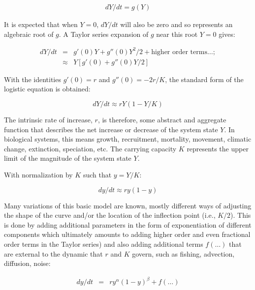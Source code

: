 \documentclass[letterpaper,portrait,11pt]{scrartcl}
\numberwithin{equation}{section}		%
\numberwithin{figure}{section}		%
\numberwithin{table}{section}				%
\begin{document}
\begin{eqnarray} 
\label{eqLogisticContinuous}
dY / dt = g(Y)
\end{eqnarray}

It is expected that when $Y = 0$, $dY/dt$ will also be zero and so represents an algebraic root of $g$. A Taylor series expansion of $g$ near this root $Y=0$ gives:

\begin{eqnarray*} 
  \label{eqLogisticTaylorSeries}
  dY / dt &=&  g'(0) Y + g''(0) Y^{2}/2  + \text{higher order terms} \dots; \\
  &\approx& Y [g'(0) + g''(0) Y/2  ]
\end{eqnarray*}


With the identities $g'(0) = r$  and $g''(0) = - 2r/K$, the standard form of the logistic equation is obtained:

\begin{equation} 
\label{eqLogistic}
dY/dt \approx r Y (1 - Y/K)
\end{equation}

The intrinsic rate of increase, $r$, is therefore, some abstract and aggregate function that describes the net increase or decrease of the system state $Y$. In biological systems, this means growth, recruitment, mortality, movement, climatic change, extinction, speciation, etc. The carrying capacity $K$ represents the upper limit of the magnitude of the system state $Y$.

With normalization by $K$ such that $ y = Y/K $:

\begin{equation} 
\label{eqLogisticBasic}
dy/dt  \approx  r y (1 - y)
\end{equation}

Many variations of this basic model are known, mostly different ways of adjusting the shape of the curve and/or the location of the inflection point (i.e., $K/2$). This is done by adding additional parameters in the form of exponentiation of different components which ultimately amounts to adding higher order and even fractional order terms in the Taylor series) and also adding additional terms $f(\dots)$ that are external to the dynamic that $r$ and $K$ govern, such as fishing, advection, diffusion, noise: 

\begin{eqnarray} 
\label{eqLogisticGeneral}
dy / dt &=& r y^{\alpha} ( 1 - y )^{\beta} + f(\dots)
\end{eqnarray}
\end{document}
